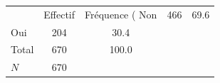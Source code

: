 {
\def\sym#1{\ifmmode^{#1}\else\(^{#1}\)\fi}
\begin{tabular}{l*{1}{cc}}
\toprule
            &    Effectif&Fréquence (%
\midrule
Non         &         466&        69.6\\
Oui         &         204&        30.4\\
Total       &         670&       100.0\\
\midrule
\(N\)       &         670&            \\
\bottomrule
\end{tabular}
}
